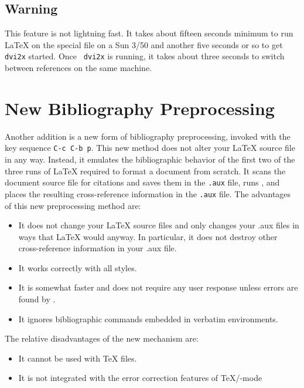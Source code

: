 \subsection{Warning}

This feature is not lightning fast.  It takes about fifteen
seconds minimum to run {\LaTeX} on the special file on a Sun 3/50 and
another five seconds or so to get {\tt dvi2x} started.  Once {\tt
dvi2x} is running, it takes about three seconds to switch between
references on the same machine.

\section{New Bibliography Preprocessing}

Another addition is a new form of bibliography preprocessing, invoked
with the key sequence \verb+C-c C-b p+.  This new method does not
alter your {\LaTeX} source file in any way.  Instead, it emulates the
bibliographic behavior of the first two of the three runs of {\LaTeX}
required to format a document from scratch.  It scans the document
source file for citations and saves them in the \verb+.aux+ file, runs
{\BibTeX}, and places the resulting cross-reference information in the
\verb+.aux+ file.  The advantages of this new preprocessing method
are:
\begin{itemize}
\item It does not change your {\LaTeX} source files and only changes your
	.aux files in ways that {\LaTeX} would anyway.  In particular, it
	does not destroy other cross-reference information in your
	.aux file.

\item It works correctly with all {\BibTeX} styles.

\item It is somewhat faster and does not require any user response unless
	errors are found by {\BibTeX}.

\item It ignores bibliographic commands embedded in verbatim
	environments.
\end{itemize}
The relative disadvantages of the new mechanism are:
\begin{itemize}
\item It cannot be used with {\TeX} files.

\item It is not integrated with the error correction features of
	{\TeX}/{\BibTeX}-mode
\end{itemize}

